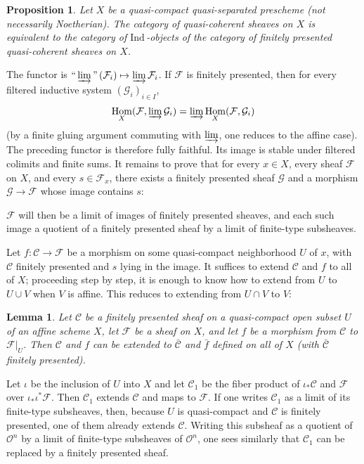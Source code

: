 \documentclass[11pt]{amsart}
\DeclareMathOperator{\Hom}{Hom}
\newcommand{\Ind}{\text{Ind}\,}
\newcommand{\cF}{\mathcal{F}}
\newcommand{\cG}{\mathcal{G}}
\newcommand{\cO}{\mathcal{O}}
\newcommand{\cC}{\mathcal{C}}
\theoremstyle{plain}
\newtheorem{prop}{Proposition}
\newtheorem{lem}{Lemma}
\theoremstyle{definition}
\begin{document}
\begin{prop}
Let $X$ be a quasi-compact quasi-separated prescheme (not necessarily Noetherian). The category of quasi-coherent sheaves on $X$ is equivalent to the category of $\Ind$-objects of the category of finitely presented quasi-coherent sheaves on $X$.
\end{prop}

The functor is $\text{``}\varinjlim\text{''}\,(\cF_i)\mapsto \varinjlim \cF_i$. If $\cF$ is finitely presented, then for every filtered inductive system $(\cG_i)_{i\in I}$,
\[
\Hom_X(\cF,\varinjlim \cG_i)=\varinjlim \Hom_X(\cF,\cG_i)
\]
(by a finite gluing argument commuting with $\varinjlim$, one reduces to the affine case). The preceding functor is therefore fully faithful. Its image is stable under filtered colimits and finite sums. It remains to prove that for every $x\in X$, every sheaf $\cF$ on $X$, and every $s\in \cF_x$, there exists a finitely presented sheaf $\cG$ and a morphism $\cG\to\cF$ whose image contains $s$:

$\cF$ will then be a limit of images of finitely presented sheaves, and each such image a quotient of a finitely presented sheaf by a limit of finite-type subsheaves.

Let $f\colon \cC\to\cF$ be a morphism on some quasi-compact neighborhood $U$ of $x$, with $\cC$ finitely presented and $s$ lying in the image. It suffices to extend $\cC$ and $f$ to all of $X$; proceeding step by step, it is enough to know how to extend from $U$ to $U\cup V$ when $V$ is affine. This reduces to extending from $U\cap V$ to $V$:

\begin{lem}
Let $\cC$ be a finitely presented sheaf on a quasi-compact open subset $U$ of an affine scheme $X$, let $\cF$ be a sheaf on $X$, and let $f$ be a morphism from $\cC$ to $\cF|_U$. Then $\cC$ and $f$ can be extended to $\bar{\cC}$ and $\bar f$ defined on all of $X$ (with $\bar{\cC}$ finitely presented).
\end{lem}

Let $\iota$ be the inclusion of $U$ into $X$ and let $\cC_1$ be the fiber product of $\iota_*\cC$ and $\cF$ over $\iota_*\iota^*\cF$. Then $\cC_1$ extends $\cC$ and maps to $\cF$. If one writes $\cC_1$ as a limit of its finite-type subsheaves, then, because $U$ is quasi-compact and $\cC$ is finitely presented, one of them already extends $\cC$. Writing this subsheaf as a quotient of $\cO^n$ by a limit of finite-type subsheaves of $\cO^n$, one sees similarly that $\cC_1$ can be replaced by a finitely presented sheaf.
\end{document}
